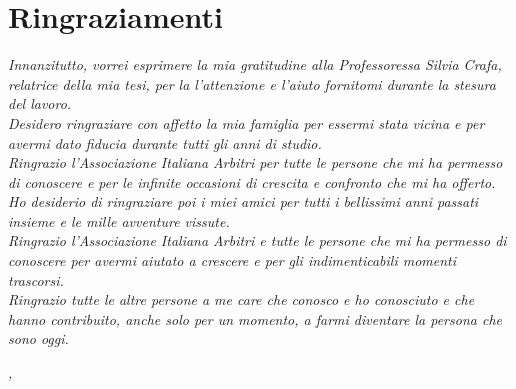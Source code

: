 
\cleardoublepage
{}
{}

\bigskip

\begingroup
\let\clearpage\relax
\let\cleardoublepage\relax
\let\cleardoublepage\relax

\chapter*{Ringraziamenti}

\noindent \textit{Innanzitutto, vorrei esprimere la mia gratitudine alla Professoressa Silvia Crafa, relatrice della mia tesi, per la l'attenzione e l'aiuto fornitomi durante la stesura del lavoro.}\\

\noindent \textit{Desidero ringraziare con affetto la mia famiglia per essermi stata vicina e per avermi dato fiducia durante tutti gli anni di studio.}\\

\noindent \textit{Ringrazio l'Associazione Italiana Arbitri per tutte le persone che mi ha permesso di conoscere e per le infinite occasioni di crescita e confronto che mi ha offerto.}\\

\noindent \textit{Ho desiderio di ringraziare poi i miei amici per tutti i bellissimi anni passati insieme e le mille avventure vissute.}\\

\noindent \textit{Ringrazio l'Associazione Italiana Arbitri e tutte le persone che mi ha permesso di conoscere per avermi aiutato a crescere e per gli indimenticabili momenti trascorsi.}\\

\noindent \textit{Ringrazio tutte le altre persone a me care che conosco e ho conosciuto e che hanno
contribuito, anche solo per un momento, a farmi diventare la persona che sono oggi.}\\
\bigskip

\noindent\textit{\myLocation, \myTime}
\hfill \myName

\endgroup

